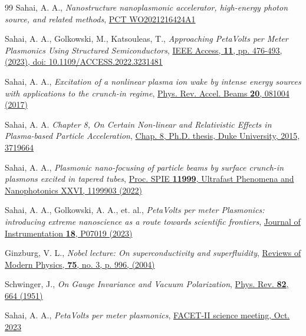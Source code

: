 \documentclass[aps,twocolumn,notitlepage,superscriptaddress]{revtex4-1}
\begin{document}
\begin{thebibliography}{99}
 Sahai, A. A.,
	\textit{Nanostructure nanoplasmonic accelerator, high-energy photon source, and related methods},
	\href{https://patentimages.storage.googleapis.com/55/0a/6c/7b757efb9e9547/WO2021216424A1.pdf}{PCT WO2021216424A1}
	
 Sahai, A. A., Golkowski, M., Katsouleas, T., 
	\textit{Approaching PetaVolts per Meter Plasmonics Using Structured Semiconductors},
	 \href{https://doi.org/10.1109/ACCESS.2022.3231481}{IEEE Access, {\bf 11}, pp. 476-493, (2023), doi: 10.1109/ACCESS.2022.3231481}
	 
Sahai, A. A.,
	\textit{Excitation of a nonlinear plasma ion wake by intense energy sources with applications to the crunch-in regime},
	\href{https://doi.org/10.1103/PhysRevAccelBeams.20.081004}{Phys. Rev. Accel. Beams {\bf 20}, 081004 (2017)}

Sahai, A. A.
	 \textit{Chapter 8, On Certain Non-linear and Relativistic Effects in Plasma-based Particle Acceleration},
	 \href{hhttps://dukespace.lib.duke.edu/dspace/handle/10161/10534}{Chap. 8, Ph.D. thesis, Duke University, 2015, 3719664}
	
Sahai, A. A.,
	\textit{Plasmonic nano-focusing of particle beams by surface crunch-in plasmons excited in tapered tubes},
	\href{https://doi.org/10.1117/12.2605722}{Proc. SPIE {\bf 11999}, Ultrafast Phenomena and Nanophotonics XXVI, 1199903 (2022)}
	
Sahai, A. A., Golkowski, A. A., et. al.,
	\textit{PetaVolts per meter Plasmonics: introducing extreme nanoscience as a route towards scientific frontiers},
	\href{https://doi.org/10.1088/1748-0221/18/07/P07019}{Journal of Instrumentation {\bf 18}, P07019 (2023)}
	
 Ginzburg, V. L.,
	\textit{Nobel lecture: On superconductivity and superfluidity},
	\href{https://doi.org/10.1103/RevModPhys.76.981}{Reviews of Modern Physics, {\bf 75}, no. 3, p. 996, (2004)}	
	
Schwinger, J.,
	\textit{On Gauge Invariance and Vacuum Polarization},
	\href{https://doi.org/10.1103/PhysRev.82.664}{Phys. Rev. {\bf 82}, 664 (1951)}
	
Sahai, A. A.,
	\textit{PetaVolts per meter plasmonics},
	\href{https://facet-ii.slac.stanford.edu/sites/default/files/2023-10/PetaVolts per meter Plasmonics_SAHAI.pdf}{FACET-II science meeting, Oct. 2023}
	

\end{thebibliography}
\end{document}
